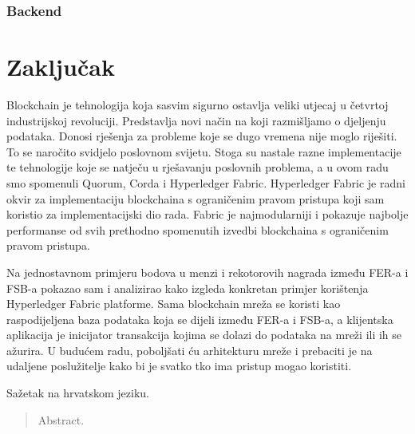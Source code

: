 \documentclass[times, utf8, diplomski]{fer}
\begin{document}
\subsection{Backend}

\chapter{Zaključak}
Blockchain je tehnologija koja sasvim sigurno ostavlja veliki utjecaj u četvrtoj industrijskoj revoluciji. Predstavlja novi način na koji razmišljamo o djeljenju podataka. Donosi rješenja za probleme koje se dugo vremena nije moglo riješiti. To se naročito svidjelo poslovnom svijetu. Stoga su nastale razne implementacije te tehnologije koje se natječu u rješavanju poslovnih problema, a u ovom radu smo spomenuli Quorum, Corda i Hyperledger Fabric. Hyperledger Fabric je radni okvir za implementaciju blockchaina s ograničenim pravom pristupa koji sam koristio za implementacijski dio rada. Fabric je najmodularniji i pokazuje najbolje performanse od svih prethodno spomenutih izvedbi blockchaina s ograničenim pravom pristupa.

Na jednostavnom primjeru bodova u menzi i rekotorovih nagrada između FER-a i FSB-a pokazao sam i analizirao kako izgleda konkretan primjer korištenja Hyperledger Fabric platforme. Sama blockchain mreža se koristi kao raspodijeljena baza podataka koja se dijeli između FER-a i FSB-a, a klijentska aplikacija je inicijator transakcija kojima se dolazi do podataka na mreži ili ih se ažurira. U budućem radu, poboljšati ću arhitekturu mreže i prebaciti je na udaljene poslužitelje kako bi je svatko tko ima pristup mogao koristiti.



\begin{sazetak}
Sažetak na hrvatskom jeziku.

\end{sazetak}

\begin{abstract}
Abstract.

\end{abstract}
\end{document}
